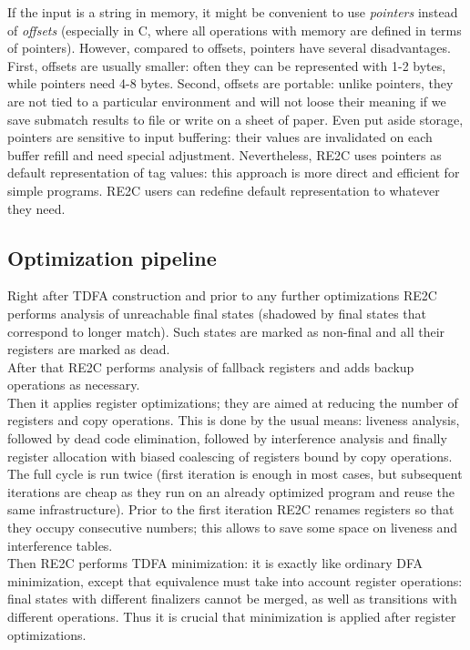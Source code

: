 \documentclass{article}
\theoremstyle{definition}
\begin{document}
\begin{multicols}{2}
If the input is a string in memory, it might be convenient to use \emph{pointers} instead of \emph{offsets}
(especially in C, where all operations with memory are defined in terms of pointers).
However, compared to offsets, pointers have several disadvantages.
First, offsets are usually smaller: often they can be represented with 1-2 bytes, while pointers need 4-8 bytes.
Second, offsets are portable: unlike pointers, they are not tied to a particular environment
and will not loose their meaning if we save submatch results to file or write on a sheet of paper.
Even put aside storage, pointers are sensitive to input buffering:
their values are invalidated on each buffer refill and need special adjustment.
Nevertheless, RE2C uses pointers as default representation of tag values:
this approach is more direct and efficient for simple programs.
RE2C users can redefine default representation to whatever they need.

\subsection*{Optimization pipeline}

Right after TDFA construction and prior to any further optimizations
RE2C performs analysis of unreachable final states
(shadowed by final states that correspond to longer match).
Such states are marked as non-final and all their registers are marked as dead.
\\

After that RE2C performs analysis of fallback registers and adds backup operations as necessary.
\\

Then it applies register optimizations;
they are aimed at reducing the number of registers and copy operations.
This is done by the usual means:
liveness analysis, followed by dead code elimination,
followed by interference analysis and finally register allocation
with biased coalescing of registers bound by copy operations.
The full cycle is run twice (first iteration is enough in most cases,
but subsequent iterations are cheap as they run on an already optimized program and reuse the same infrastructure).
Prior to the first iteration RE2C renames registers so that they occupy consecutive numbers;
this allows to save some space on liveness and interference tables.
\\

Then RE2C performs TDFA minimization:
it is exactly like ordinary DFA minimization, except that
equivalence must take into account register operations:
final states with different finalizers cannot be merged, as well as transitions with different operations.
Thus it is crucial that minimization is applied after register optimizations.
\\


\end{multicols}
\end{document}
